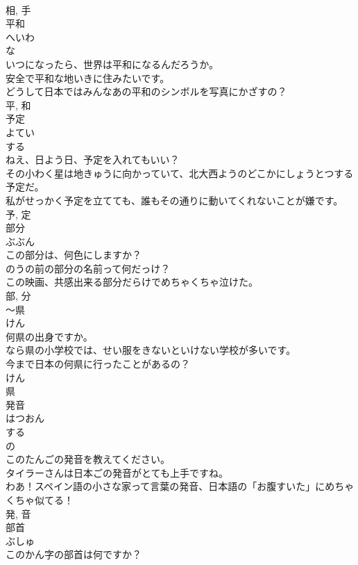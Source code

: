 \documentclass[8pt]{extreport}
\begin{document}
\begin{CJK}{UTF8}{min}
\\	相, 手	
\\	平和	
\\	へいわ	
\\	な 
\\	いつになったら、世界は平和になるんだろうか。	
\\	安全で平和な地いきに住みたいです。	
\\	どうして日本ではみんなあの平和のシンボルを写真にかざすの？	
\\	平, 和	
\\	予定	
\\	よてい	
\\	する 
\\	ねえ、日よう日、予定を入れてもいい？	
\\	その小わく星は地きゅうに向かっていて、北大西ようのどこかにしょうとつする予定だ。	
\\	私がせっかく予定を立てても、誰もその通りに動いてくれないことが嫌です。	
\\	予, 定	
\\	部分	
\\	ぶぶん	
\\	この部分は、何色にしますか？	
\\	のうの前の部分の名前って何だっけ？	
\\	この映画、共感出来る部分だらけでめちゃくちゃ泣けた。	
\\	部, 分	
\\	〜県	
\\	けん	
\\	何県の出身ですか。	
\\	なら県の小学校では、せい服をきないといけない学校が多いです。	
\\	今まで日本の何県に行ったことがあるの？	
\\	けん 
\\	県	
\\	発音	
\\	はつおん	
\\	する 
\\	の 
\\	このたんごの発音を教えてください。	
\\	タイラーさんは日本ごの発音がとても上手ですね。	
\\	わあ！スペイン語の小さな家って言葉の発音、日本語の「お腹すいた」にめちゃくちゃ似てる！	
\\	発, 音	
\\	部首	
\\	ぶしゅ	
\\	このかん字の部首は何ですか？	

\end{CJK}
\end{document}
